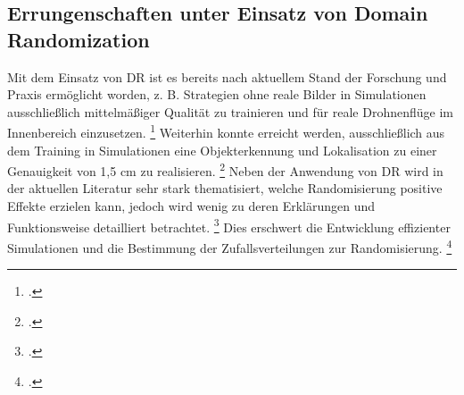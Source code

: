 \subsection{Errungenschaften unter Einsatz von Domain Randomization}

Mit dem Einsatz von DR ist es bereits nach aktuellem Stand der Forschung und Praxis ermöglicht worden, z. B. Strategien ohne reale Bilder in Simulationen ausschließlich mittelmäßiger Qualität zu trainieren und für reale Drohnenflüge im Innenbereich einzusetzen. \footcite[Vgl.][S. 1]{Sadeghi.2016} 
Weiterhin konnte erreicht werden, ausschließlich aus dem Training in Simulationen eine Objekterkennung und Lokalisation zu einer Genauigkeit von 1,5 cm zu realisieren. \footcite[Vgl.][S. 1]{Tobin.2017}
Neben der Anwendung von DR wird in der aktuellen Literatur sehr stark thematisiert, welche Randomisierung positive Effekte erzielen kann, jedoch wird wenig zu deren Erklärungen und Funktionsweise detailliert betrachtet. \footcite[Vgl.][S. 6]{Zhao.2020}
Dies erschwert die Entwicklung effizienter Simulationen und die Bestimmung der Zufallsverteilungen zur Randomisierung. \footcite[Vgl.][S. 6]{Zhao.2020}